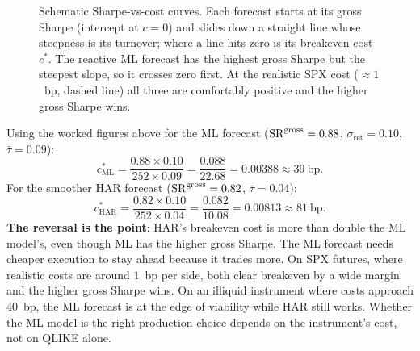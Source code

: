 \begin{figure}[htbp]
\centering
{}
\caption{Schematic Sharpe-vs-cost curves. Each forecast starts at its gross Sharpe (intercept at $c = 0$) and slides down a straight line whose steepness is its turnover; where a line hits zero is its breakeven cost $c^\ast$. The reactive ML forecast has the highest gross Sharpe but the steepest slope, so it crosses zero first. At the realistic SPX cost ($\approx 1$~bp, dashed line) all three are comfortably positive and the higher gross Sharpe wins.}
\label{fig:sharpe-cost-curve}
\end{figure}

\begin{workedexample}
Using the worked figures above for the ML forecast ($\operatorname{SR}^{\text{gross}} = 0.88$, $\sigma_{\text{ret}} = 0.10$, $\bar\tau = 0.09$):
\[
c^\ast_{\text{ML}} = \frac{0.88 \times 0.10}{252 \times 0.09} = \frac{0.088}{22.68} = 0.00388 \approx 39~\text{bp}.
\]
For the smoother HAR forecast ($\operatorname{SR}^{\text{gross}} = 0.82$, $\bar\tau = 0.04$):
\[
c^\ast_{\text{HAR}} = \frac{0.82 \times 0.10}{252 \times 0.04} = \frac{0.082}{10.08} = 0.00813 \approx 81~\text{bp}.
\]
\textbf{The reversal is the point}: HAR's breakeven cost is more than double the ML model's, even though ML has the higher gross Sharpe. The ML forecast needs cheaper execution to stay ahead because it trades more. On SPX futures, where realistic costs are around $1$~bp per side, both clear breakeven by a wide margin and the higher gross Sharpe wins. On an illiquid instrument where costs approach $40$~bp, the ML forecast is at the edge of viability while HAR still works. Whether the ML model is the right production choice depends on the instrument's cost, not on QLIKE alone.
\end{workedexample}

